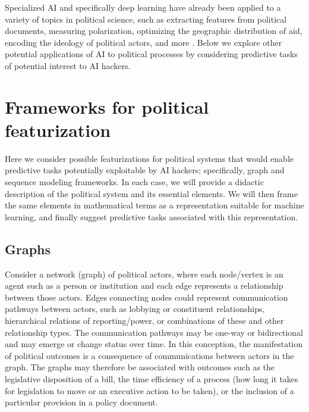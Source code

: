 \documentclass[nonacm,12pt]{acmart}
\begin{document}
Specialized AI and specifically deep learning have already been applied to a variety of topics in political science, such as extracting features from political documents, measuring polarization, optimizing the geographic distribution of aid, encoding the ideology of political actors, and more \cite{chatsiou_deep_2020}. Below we explore other potential applications of AI to political processes by considering predictive tasks of potential interest to AI hackers.

\section{Frameworks for political featurization}

Here we consider possible featurizations for political systems that would enable predictive tasks potentially exploitable by AI hackers; specifically, graph and sequence modeling frameworks.  
In each case, we will provide a didactic description of the political system and its essential elements.
We will then frame the same elements in mathematical terms as a representation suitable for machine learning, and finally suggest predictive tasks associated with this representation.

\subsection{Graphs}
\label{feat:graphs}

Consider a network (graph) of political actors, where each node/vertex is an agent such as a person or institution and each edge represents a relationship between those actors. Edges connecting nodes could represent communication pathways between actors, such as lobbying or constituent relationships, hierarchical relations of reporting/power, or combinations of these and other relationship types.  The communication pathways may be one-way or bidirectional and may emerge or change status over time. In this conception, the manifestation of political outcomes is a consequence of communications between actors in the graph. The graphs may therefore be associated with outcomes such as the legislative disposition of a bill, the time efficiency of a process (how long it takes for legislation to move or an executive action to be taken), or the inclusion of a particular provision in a policy document.
\end{document}
